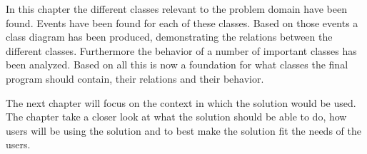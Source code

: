 In this chapter the different classes relevant to the problem domain have been found. Events have been found for each of these classes. 
Based on those events a class diagram has been produced, demonstrating the relations between the different classes. Furthermore the behavior of a number of important classes has been analyzed. Based on all this is now a foundation for what classes the final program should contain, their relations and their behavior.

The next chapter will focus on the context in which the solution would be used. The chapter take a closer look at what the solution should be able to do, how users will be using the solution and to best make the solution fit the needs of the users.